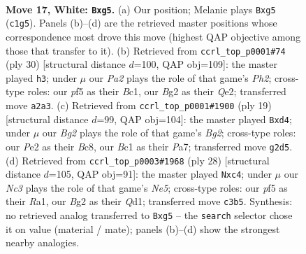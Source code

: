 \documentclass[11pt]{article}
\begin{document}
\clearpage

\begin{figure}[p]\centering
\begin{subfigure}{0.46\textwidth}\centering
\resizebox{\linewidth}{!}{%
\newchessgame
\chessboard[
  setfen={rnbqk2r/8/5n2/ppbp1pp1/8/2N3P1/PP2PPB1/R1BQNRK1 w kq - 0 17},
  showmover=false,
  pgfstyle=straightmove, color=movearrow, markmove={c1-g5}
]}
\caption{}
\end{subfigure}\hfill
\begin{subfigure}{0.46\textwidth}\centering
\resizebox{\linewidth}{!}{%
\newchessgame
\chessboard[
  setfen={r3k2r/1pqb1pb1/p2p1n2/4pP1p/8/1B3N2/PPP1Q1PP/R1B2RK1 w kq - 0 16},
  showmover=false,
  pgfstyle=straightmove, color=movearrow, markmove={h2-h3}
]}
\caption{}
\end{subfigure}
\\[4pt]
\begin{subfigure}{0.46\textwidth}\centering
\resizebox{\linewidth}{!}{%
\newchessgame
\chessboard[
  setfen={r1bqk2r/pp2ppbp/2n3p1/6B1/3PP3/5N2/P4PPP/2RQKB1R b Kkq - 0 10},
  showmover=false,
  pgfstyle=straightmove, color=movearrow, markmove={g7-d4}
]}
\caption{}
\end{subfigure}\hfill
\begin{subfigure}{0.46\textwidth}\centering
\resizebox{\linewidth}{!}{%
\newchessgame
\chessboard[
  setfen={rn1qk2r/p4ppp/4p3/b3N3/P1ppnP2/6P1/NP2P2P/R1BQ1RK1 w kq - 0 15},
  showmover=false,
  pgfstyle=straightmove, color=movearrow, markmove={e5-c4}
]}
\caption{}
\end{subfigure}
\caption{\textbf{Move 17, White: \texttt{Bxg5}.} (a) Our position; Melanie plays \texttt{Bxg5} (\texttt{c1g5}). Panels (b)--(d) are the retrieved master positions whose correspondence most drove this move (highest QAP objective among those that transfer to it). (b) Retrieved from \texttt{ccrl\_top\_p0001\#74} (ply 30) [structural distance $d$=100, QAP obj=109]: the master played \texttt{h3}; under $\mu$ our \emph{Pa2} plays the role of that game's \emph{Ph2}; cross-type roles: our \emph{p}f5 as their \emph{B}c1, our \emph{B}g2 as their \emph{Q}e2; transferred move \texttt{a2a3}. (c) Retrieved from \texttt{ccrl\_top\_p0001\#1900} (ply 19) [structural distance $d$=99, QAP obj=104]: the master played \texttt{Bxd4}; under $\mu$ our \emph{Bg2} plays the role of that game's \emph{Bg2}; cross-type roles: our \emph{P}e2 as their \emph{B}c8, our \emph{B}c1 as their \emph{P}a7; transferred move \texttt{g2d5}. (d) Retrieved from \texttt{ccrl\_top\_p0003\#1968} (ply 28) [structural distance $d$=105, QAP obj=91]: the master played \texttt{Nxc4}; under $\mu$ our \emph{Nc3} plays the role of that game's \emph{Ne5}; cross-type roles: our \emph{p}f5 as their \emph{R}a1, our \emph{B}g2 as their \emph{Q}d1; transferred move \texttt{c3b5}. Synthesis: no retrieved analog transferred to \texttt{Bxg5} -- the \texttt{search} selector chose it on value (material / mate); panels (b)--(d) show the strongest nearby analogies.}
\label{fig:thought-m32}
\end{figure}
\end{document}
